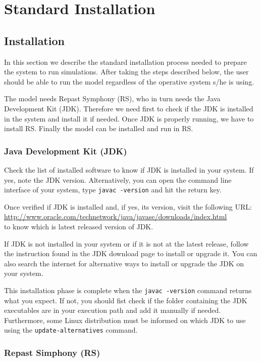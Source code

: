 \documentclass{book}
\begin{document}
\chapter{Standard Installation}
\section{Installation}

In this section we describe the standard installation process needed to prepare the system to run simulations. After taking the steps described below, the user should be able to run the model regardless of the operative system s/he is using.

The model needs Repast Symphony (RS), who in turn needs the Java Development Kit (JDK). Therefore we need first to check if the JDK is installed in the system and install it if needed. Once JDK is properly running, we have to install RS. Finally the model can be installed and run in RS.

\subsection{Java Development Kit (JDK)}

Check the list of installed software to know if JDK is installed in your system. If yes, note the JDK version.
Alternatively, you can open the command line interface of your system, type \verb+javac -version+ and hit the return key. 

Once verified if JDK is installed and, if yes, its version, visit the following URL:\\
\url{http://www.oracle.com/technetwork/java/javase/downloads/index.html}\\
to know which is latest released version of JDK.

If JDK is not installed in your system or if it is not at the latest release, follow the instruction found in the JDK download page to install or upgrade it. You can also search the internet for alternative ways to install or upgrade the JDK on your system.

This installation phase is complete when the \verb+javac -version+ command returns what you expect.
If not, you should fist check if the folder containing the JDK executables are in your execution path and add it manually if needed.
Furthermore, some Linux distribution must be informed on which JDK to use using the \verb+update-alternatives+ command. 

\subsection{Repast Simphony (RS)}
\end{document}
